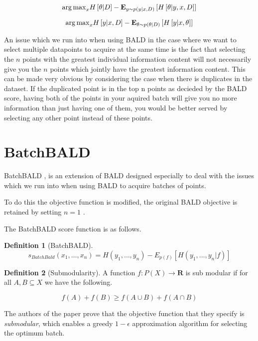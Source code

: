 \documentclass[12pt, a4paper]{report}
\theoremstyle{definition}
\newtheorem{definition}{Definition}[section]
\begin{document}
$${\operatorname*{arg\,max}}_x H \left[ \theta | D \right] - \mathbf{E}_{y \sim p(y | x, D)} \left[ H\left[ \theta | y, x, D\right]\right]$$

$${\operatorname*{arg\,max}}_x H \left[ y | x, D \right] - \mathbf{E}_{\theta \sim p(\theta | D)} \left[ H\left[ y | x, \theta \right]\right]$$


An issue which we run into when using BALD in the case where we want to select multiple datapoints to acquire at the same time is the fact that selecting the $n$ points with the greatest individual information content will not necessarily give you the $n$ points which jointly have the greatest information content. This can be made very obvious by considering the case when there is duplicates in the dataset. If the duplicated point is in the top n points as decieded by the BALD score, having both of the points in your aquired batch will give you no more information than just having one of them, you would be better served by selecting any other point instead of these points.

\section{BatchBALD}
BatchBALD \cite{kirsch2019batchbald}, is an extension of BALD designed especially to deal with the issues which we run into when using BALD to acquire batches of points.

To do this the objective function is modified, the original BALD objective is retained by setting $n = 1$ .

The BatchBALD score function is as follows.


\begin{definition}[BatchBALD]
    $$s_{BatchBald} (x_1, \ldots, x_n) = H(y_1, \ldots, y_n) - E_{p(f)}\left[H(y_1, \ldots, y_n | f)\right]$$
\end{definition}


\begin{definition}[Submodularity]
    A function $f : P(X) \rightarrow \mathbf{R}$ is sub modular if for all $A,B \subseteq X$ we have the following.

    $$f(A) + f(B) \geq f\left( A \cup B \right) +  f\left(A \cap B \right) $$
\end{definition}

The authors of the paper prove that the objective function that they specify is \textit{submodular}, which enables a greedy $1 - \epsilon$ approximation algorithm for selecting the optimum batch.
\end{document}
